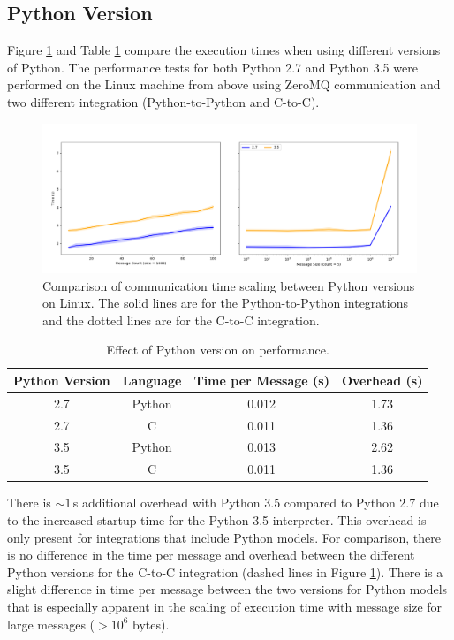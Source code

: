 \documentclass[journal]{IEEEtran}
\newcommand{\todo}[1]{{\color{red}{#1}}}
\begin{document}
\subsection{Python Version}\label{SS:results_python}
%
Figure \ref{fig:python} and Table \ref{tab:python} compare the execution times when using different versions of Python. The performance tests for both Python 2.7 and Python 3.5 were performed on the Linux machine from above using ZeroMQ communication and two different integration (Python-to-Python and C-to-C).
%
\ifinclfig
 	\begin{figure}[htbp]
	\begin{center}
	\includegraphics[width=\columnwidth,keepaspectratio]{./images/scaling_python.png}
	\caption{Comparison of communication time scaling between Python versions on Linux. The solid lines are for the Python-to-Python integrations and the dotted lines are for the C-to-C integration.}
	\label{fig:python}
	\end{center}
	\end{figure}
\fi
%
\begin{table}[htbp]
\begin{center}
\begin{tabular}{|c|c|c|c|}
\hline
Python Version	& Language	& Time per Message (s) 	& Overhead (s) 	\\\hline
2.7			& Python		& 0.012				& 1.73			\\
2.7			& C			& 0.011				& 1.36			\\
3.5 			& Python		& 0.013				& 2.62			\\
3.5			& C			& 0.011				& 1.36			\\\hline
\end{tabular}
\end{center}
\caption{Effect of Python version on performance.}
\label{tab:python}
\end{table}          
%
There is $\sim1$\,s additional overhead with Python 3.5 compared to Python 2.7 due to the increased startup time for the Python 3.5 interpreter. This overhead is only present for integrations that include Python models. For comparison, there is no difference in the time per message and overhead between the different Python versions for the C-to-C integration (dashed lines in Figure \ref{fig:python}). There is a slight difference in time per message between the two versions for Python models that is especially apparent in the scaling of execution time with message size for large messages ($>10^6$ bytes). 
\todo{discussion of large message scaling}
\end{document}
